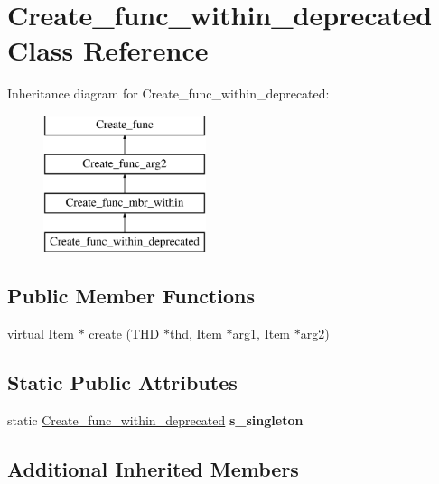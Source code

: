 \hypertarget{classCreate__func__within__deprecated}{}\section{Create\+\_\+func\+\_\+within\+\_\+deprecated Class Reference}
\label{classCreate__func__within__deprecated}
Inheritance diagram for Create\+\_\+func\+\_\+within\+\_\+deprecated\+:\begin{figure}[H]
\begin{center}
\leavevmode
\includegraphics[height=4.000000cm]{classCreate__func__within__deprecated}
\end{center}
\end{figure}
\subsection*{Public Member Functions}
\begin{DoxyCompactItemize}
\item 
virtual \mbox{\hyperlink{classItem}{Item}} $\ast$ \mbox{\hyperlink{classCreate__func__within__deprecated_a5e2b56b68f6c7948556fe19e51c9405f}{create}} (T\+HD $\ast$thd, \mbox{\hyperlink{classItem}{Item}} $\ast$arg1, \mbox{\hyperlink{classItem}{Item}} $\ast$arg2)
\end{DoxyCompactItemize}
\subsection*{Static Public Attributes}
\begin{DoxyCompactItemize}
\item 
\mbox{\label{classCreate__func__within__deprecated_a77d4df6efed0851edce8e4953e4c796f}} 
static \mbox{\hyperlink{classCreate__func__within__deprecated}{Create\+\_\+func\+\_\+within\+\_\+deprecated}} {\bfseries s\+\_\+singleton}
\end{DoxyCompactItemize}
\subsection*{Additional Inherited Members}


